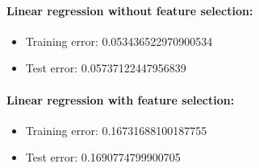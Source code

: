 \documentclass[10pt, paper=a4]{article}
\begin{document}
\begin{figure}[h]
  \begin{minipage}{0.5\textwidth}
    \paragraph{Linear regression without feature selection:}
    \begin{itemize}
    \item Training error: 0.053436522970900534
    \item Test error:     0.05737122447956839
    \end{itemize}
  \end{minipage} \hfill
  \begin{minipage}{0.5\textwidth}
    \paragraph{Linear regression with feature selection:}
    \begin{itemize}
    \item Training error: 0.16731688100187755
    \item Test error:     0.1690774799900705
    \end{itemize}
  \end{minipage} \vfill
\end{figure}







\end{document}
